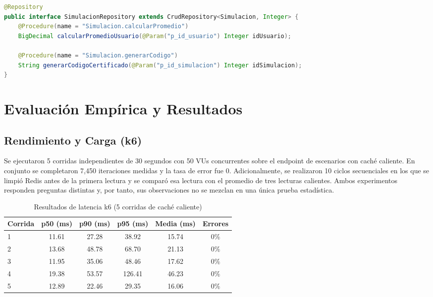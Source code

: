 \documentclass[11pt,a4paper]{report}
\begin{document}
\begin{lstlisting}[language=Java, caption={Invocación formal mediante @Procedure en Spring Data JPA}]
@Repository
public interface SimulacionRepository extends CrudRepository<Simulacion, Integer> {
    @Procedure(name = "Simulacion.calcularPromedio")
    BigDecimal calcularPromedioUsuario(@Param("p_id_usuario") Integer idUsuario);

    @Procedure(name = "Simulacion.generarCodigo")
    String generarCodigoCertificado(@Param("p_id_simulacion") Integer idSimulacion);
}
\end{lstlisting}

\chapter{Evaluación Empírica y Resultados}

\section{Rendimiento y Carga (k6)}
Se ejecutaron 5 corridas independientes de 30 segundos con 50 VUs concurrentes sobre el endpoint de escenarios con caché caliente. En conjunto se completaron 7,450 iteraciones medidas y la tasa de error fue 0. Adicionalmente, se realizaron 10 ciclos secuenciales en los que se limpió Redis antes de la primera lectura y se comparó esa lectura con el promedio de tres lecturas calientes. Ambos experimentos responden preguntas distintas y, por tanto, sus observaciones no se mezclan en una única prueba estadística.

\begin{table}[htbp]
\centering
\caption{Resultados de latencia k6 (5 corridas de caché caliente)}
\label{tab:k6_results}
\begin{tabular}{lccccc}
\toprule
\textbf{Corrida} & \textbf{p50 (ms)} & \textbf{p90 (ms)} & \textbf{p95 (ms)} & \textbf{Media (ms)} & \textbf{Errores} \\
\midrule
1 & 11.61 & 27.28 & 38.92 & 15.74 & 0\% \\
2 & 13.68 & 48.78 & 68.70 & 21.13 & 0\% \\
3 & 11.95 & 35.06 & 48.46 & 17.62 & 0\% \\
4 & 19.38 & 53.57 & 126.41 & 46.23 & 0\% \\
5 & 12.89 & 22.46 & 29.35 & 16.06 & 0\% \\
\bottomrule
\end{tabular}
\end{table}
\end{document}
